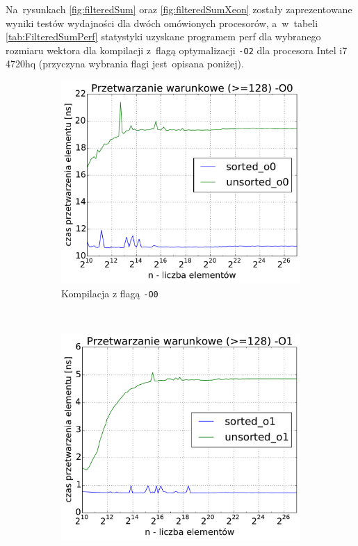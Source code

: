 Na~rysunkach \ref{fig:filteredSum} oraz \ref{fig:filteredSumXeon} zostały zaprezentowane wyniki testów wydajności dla dwóch omówionych procesorów, a~w~tabeli \ref{tab:FilteredSumPerf} statystyki uzyskane programem perf dla wybranego rozmiaru wektora dla kompilacji z~flagą optymalizacji \texttt{-O2} dla procesora Intel i7 4720hq (przyczyna wybrania flagi jest~opisana poniżej). 

\begin{figure}
    \centering
    \begin{subfigure}[c]{0.45\textwidth}
        \centering
        \includegraphics[width=\textwidth]{images/benchs/filtered_sum_O0}
        \caption{Kompilacja z flagą \texttt{-O0}}
    \end{subfigure}
    ~
    \begin{subfigure}[c]{0.45\textwidth}
        \centering
        \includegraphics[width=\textwidth]{images/benchs/filtered_sum_O1}

\end{subfigure}
\end{figure}
